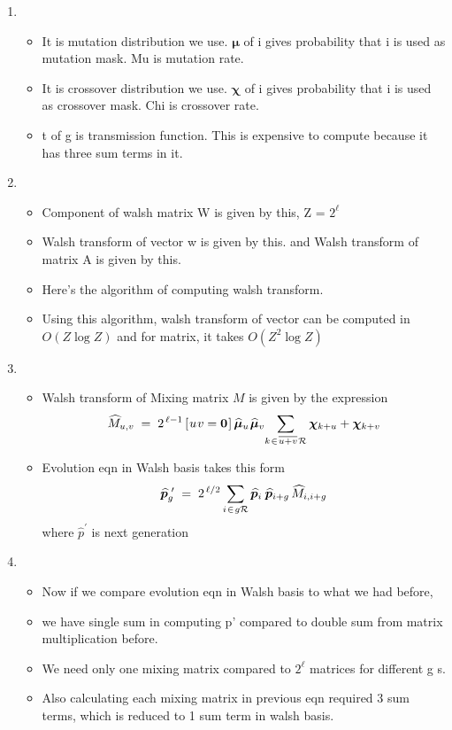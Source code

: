 \documentclass{article}
\newcommand{\nudge}{\hspace{0.01in}}
\begin{document}
\begin{enumerate}
\item
  \begin{itemize}
  \item It is mutation distribution we use. $\bm{\mu}$ of i gives probability that i is used as mutation mask. Mu is mutation rate.
  \item It is crossover  distribution we use. $\bm{\chi}$ of i gives probability that i is used as crossover mask. Chi is crossover rate.
  \item t of g is transmission function. This is expensive to compute because it has three sum terms in it.  
  \end{itemize}
    
\item
  \begin{itemize}
  \item Component of walsh matrix W is given by this, Z = $2^\ell$
  \item Walsh transform of vector w is given by this. 
    and Walsh transform of matrix A is given by this.
  \item Here's the algorithm of computing walsh transform.
  \item Using this algorithm, walsh transform of vector can be computed in $O(Z \log Z)$ and for matrix, it takes $O(Z^2 \log Z)$
  \end{itemize}
  
\item
  \begin{itemize}
  \item Walsh transform of Mixing matrix $M$ is given by the expression
    \[
      \widehat{M}_{u,v} \; = \; 2^{\,\ell-1} \,[\nudge u \nudge v = {\bf
      0}\nudge]\, \widehat{\bm{\mu}}_u \nudge \widehat{\bm{\mu}}_v \!  \sum_{k
    \nudge \in \nudge \overline{u+v} \nudge \mathcal{R}} \bm{\chi}_{k + u} +
    \bm{\chi}_{k + v}
    \]
  \item Evolution eqn in Walsh basis takes this form
  \[
    \widehat{\bm{p}}_g^{\,\,\prime} \; = \; 2^{\,\ell/2} \sum_{i \nudge \in \nudge g \mathcal{R}}
    \widehat{\bm{p}}_i \, \nudge \widehat{\bm{p}}_{i+g} \,\widehat{M}_{i,i+g}
  \]  
  where $\hat{p}^\prime$ is next generation
  \end{itemize}
    
\item
  \begin{itemize}
  \item Now if we compare evolution eqn in Walsh basis to what we had before,
  \item we have single sum in computing p' compared to double sum from matrix multiplication before. 
  \item We need only one mixing matrix compared to $2^\ell$ matrices for different g s.
  \item Also calculating each mixing matrix in previous eqn required 3 sum terms, which is reduced to 1 sum term in walsh basis.   
  \end{itemize}
    

\end{enumerate}
\end{document}
